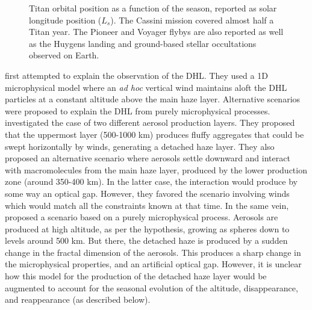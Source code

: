 \begin{figure*}[ht!]
\caption{Titan orbital position as a function of the season, reported as solar longitude position ($L_s$).
The Cassini mission covered almost half a Titan year. The Pioneer and Voyager flybys are also reported
as well as the Huygens landing and ground-based stellar occultations observed on Earth.}
\label{fig:titan_seasons}
\end{figure*}

 \cite{Toon1992} first attempted to explain the observation of the DHL. They used a 1D microphysical
model where an \emph{ad hoc} vertical wind maintains aloft the DHL particles at a constant altitude above the main
haze layer. Alternative scenarios were proposed to explain the DHL from purely microphysical processes. \cite{Chassefiere1995}
investigated the case of two different aerosol production layers. They proposed that the uppermost layer (500-1000 km)
produces fluffy aggregates that could be swept horizontally by winds, generating a detached haze layer. They also
proposed an alternative scenario where aerosols settle downward and interact with macromolecules from the main haze layer,
produced by the lower production zone (around 350-400 km). In the latter case, the interaction would produce by some
way an optical gap. However, they favored the scenario involving winds which would match all the constraints
known at that time. In the same vein, \cite{Lavvas2009} proposed a scenario based on a purely microphysical process. Aerosols
are produced at high altitude, as per the \cite{Chassefiere1995} hypothesis, growing as spheres down to levels around 500 km.
But there, the detached haze is produced by a sudden change in the fractal dimension of the aerosols. This produces a
sharp change in the microphysical properties, and an artificial optical gap. However, it is unclear how this model for the
production of the detached haze layer would be augmented to account for the seasonal evolution of the altitude,
disappearance, and reappearance (as described below).

